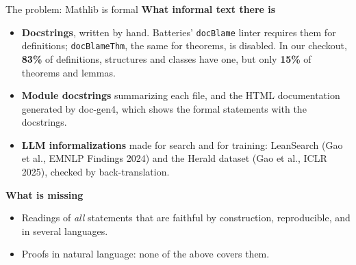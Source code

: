 \documentclass[10pt,aspectratio=169]{beamer}
\begin{document}
\begin{frame}{The problem: Mathlib is formal}
  \small
  \textbf{What informal text there is}
  \begin{itemize}
    \item \textbf{Docstrings}, written by hand. Batteries' \texttt{docBlame}
          linter requires them for definitions; \texttt{docBlameThm}, the
          same for theorems, is disabled. In our checkout,
          \textbf{83\%} of definitions, structures and classes have one, but only
          \textbf{15\%} of theorems and lemmas.
    \item \textbf{Module docstrings} summarizing each file, and the HTML
          documentation generated by doc-gen4, which shows the formal
          statements with the docstrings.
    \item \textbf{LLM informalizations} made for search and for training:
          LeanSearch (Gao et al., EMNLP Findings 2024) and the Herald
          dataset (Gao et al., ICLR 2025), checked by back-translation.
  \end{itemize}
  \textbf{What is missing}
  \begin{itemize}
    \item Readings of \emph{all} statements that are faithful by construction,
          reproducible, and in several languages.
    \item Proofs in natural language: none of the above covers them.
  \end{itemize}
\end{frame}
\end{document}
